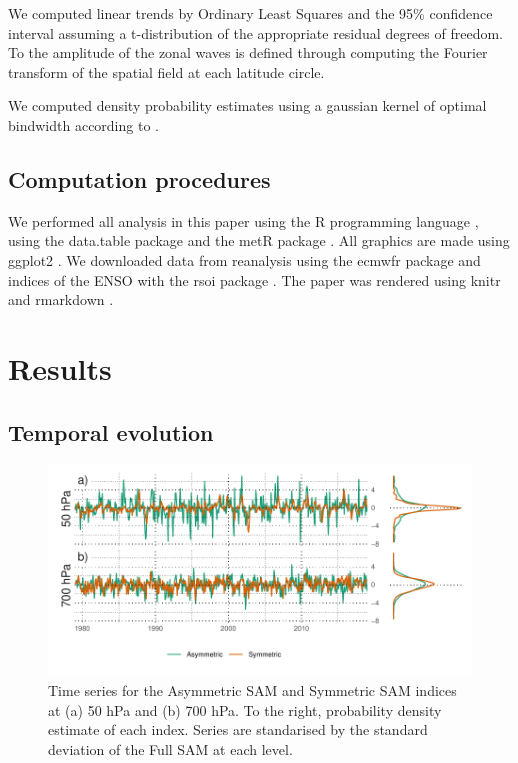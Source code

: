 \documentclass[smallextended]{svjour3}       %
\begin{document}
We computed linear trends by Ordinary Least Squares and the 95\% confidence interval assuming a t-distribution of the appropriate residual degrees of freedom. To the amplitude of the zonal waves is defined through computing the Fourier transform of the spatial field at each latitude circle.

We computed density probability estimates using a gaussian kernel of optimal bindwidth according to \citet{sheather1991}.

\hypertarget{computation-procedures}{%
\subsection{Computation procedures}\label{computation-procedures}}

We performed all analysis in this paper using the R programming language \citep{rcoreteam2020}, using the data.table package \citep{dowle2020} and the metR package \citep{campitelli2020}. All graphics are made using ggplot2 \citep{wickham2009}. We downloaded data from reanalysis using the ecmwfr package \citep{hufkens2020} and indices of the ENSO with the rsoi package \citep{albers2020}. The paper was rendered using knitr and rmarkdown \citep{xie2015, allaire2019}.

\hypertarget{results}{%
\section{Results}\label{results}}

\hypertarget{temporal}{%
\subsection{Temporal evolution}\label{temporal}}

\begin{figure}
\includegraphics{asymsam-timeseries-1} \caption{Time series for the Asymmetric SAM and Symmetric SAM indices at (a) 50 hPa and (b) 700 hPa. To the right, probability density estimate of each index. Series are standarised by the standard deviation of the Full SAM at each level.}\label{fig:asymsam-timeseries}
\end{figure}
\end{document}
